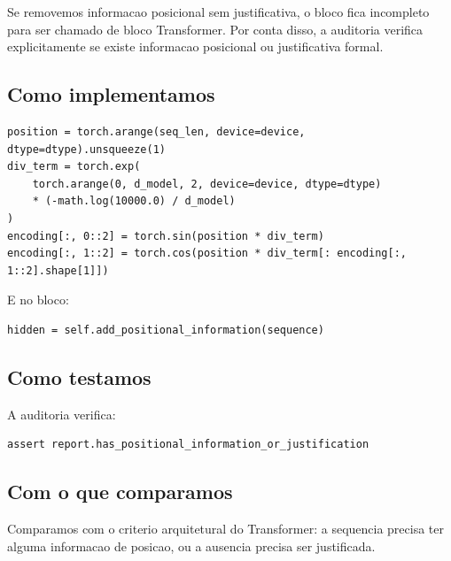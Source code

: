 Se removemos informacao posicional sem justificativa, o bloco fica incompleto para ser chamado de bloco Transformer. Por conta disso, a auditoria verifica explicitamente se existe informacao posicional ou justificativa formal.



\subsection{Como implementamos}



\begin{Verbatim}[fontsize=\small,breaklines=true,label=python]
position = torch.arange(seq_len, device=device, dtype=dtype).unsqueeze(1)
div_term = torch.exp(
    torch.arange(0, d_model, 2, device=device, dtype=dtype)
    * (-math.log(10000.0) / d_model)
)
encoding[:, 0::2] = torch.sin(position * div_term)
encoding[:, 1::2] = torch.cos(position * div_term[: encoding[:, 1::2].shape[1]])
\end{Verbatim}



E no bloco:



\begin{Verbatim}[fontsize=\small,breaklines=true,label=python]
hidden = self.add_positional_information(sequence)
\end{Verbatim}



\subsection{Como testamos}



A auditoria verifica:



\begin{Verbatim}[fontsize=\small,breaklines=true,label=python]
assert report.has_positional_information_or_justification
\end{Verbatim}



\subsection{Com o que comparamos}




Comparamos com o criterio arquitetural do Transformer: a sequencia precisa ter alguma informacao de posicao, ou a ausencia precisa ser justificada.



